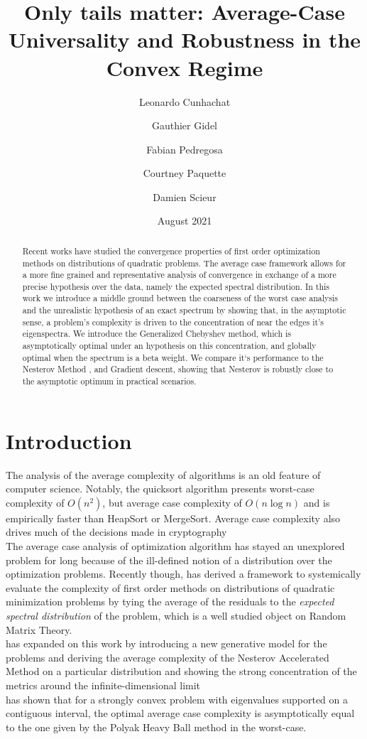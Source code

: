 \documentclass{article}
\title{Only tails matter:
Average-Case Universality and Robustness in the Convex Regime}
\author{Leonardo Cunhachat
\and Gauthier Gidel \\
\and Fabian Pedregosa \\
\and Courtney Paquette \\
\and Damien Scieur}
\date{August 2021}
\begin{document}
\maketitle
\begin{abstract}
    Recent works \cite{pedregosa2020acceleration,paquette2020halting,scieur2020universal} have studied the convergence properties of first order optimization methods on distributions of quadratic problems. 
    The average case framework allows for a more fine grained and representative analysis of convergence in exchange of a more precise hypothesis over the data, namely the expected spectral distribution. 
    In this work we introduce a middle ground between the coarseness of the  worst case analysis and the unrealistic hypothesis of an exact spectrum by showing that, in the asymptotic sense, a problem's complexity is driven to the concentration of near the edges it's eigenspectra.
    We introduce the Generalized Chebyshev method, which is   asymptotically optimal under an hypothesis on this concentration, and globally optimal when the spectrum is a beta weight.
    We compare it`s performance to the Nesterov Method \cite{nesterov2003introductory}, and Gradient descent, showing that Nesterov is robustly close to the asymptotic optimum in practical scenarios.
\end{abstract}
\section{Introduction}
The analysis of the average complexity of algorithms is an old feature of computer science. Notably, the quicksort algorithm presents worst-case complexity of $O(n^2)$, but average case complexity of $O(n\log n)$ and is  empirically faster than HeapSort or MergeSort. Average case complexity also drives much of the decisions made in cryptography \cite{bogdanov2006average}\\
The average case analysis of optimization algorithm has stayed an unexplored problem for long because of the ill-defined notion of a distribution over the optimization problems. Recently though, \cite{pedregosa2020acceleration} has derived a framework to systemically evaluate the complexity of first order methods on distributions of quadratic minimization problems by tying the average of the residuals to the \textit{expected spectral distribution} of the problem, which is a well studied object on Random Matrix Theory. \\
\cite{paquette2020halting} has expanded on this work by introducing a new generative model for the problems and deriving the average complexity of the Nesterov Accelerated Method on a particular distribution and showing the strong concentration of the metrics around the infinite-dimensional limit \\
\cite{scieur2020universal} has shown that for a strongly convex problem with eigenvalues supported on a contiguous interval, the optimal average case complexity is asymptotically equal to the one given by the Polyak Heavy Ball method in the worst-case.  
\end{document}
